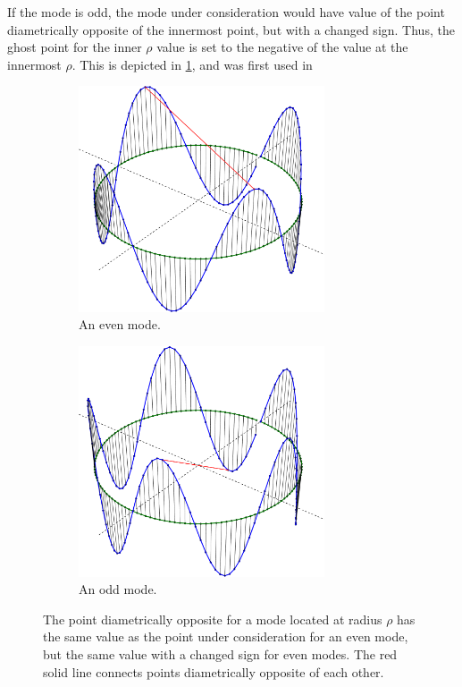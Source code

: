 If the mode is odd, the mode under consideration would have value of the point diametrically opposite of the innermost point, but with a changed sign.
Thus, the ghost point for the inner $\rho$ value is set to the negative of the value at the innermost $\rho$.
This is depicted in \cref{fig:BCLaplace}, and was first used in
%
\begin{figure}[h!]
    \centering
    \begin{subfigure}[t]{0.5\textwidth}
        \centering
        \includegraphics[width=0.8\textwidth]{fig/mode_4}
        \caption{An even mode.}
    \end{subfigure}%
    \hfill
    \begin{subfigure}[t]{0.5\textwidth}
        \centering
        \includegraphics[width=0.8\textwidth]{fig/mode_5}
        \caption{An odd mode.}
    \end{subfigure}
        \caption{The point diametrically opposite for a mode located at radius $\rho$ has the same value as the point under consideration for an even mode, but the same value with a changed sign for even modes.
            The red solid line connects points diametrically opposite of each other.}
    \label{fig:BCLaplace}
\end{figure}
